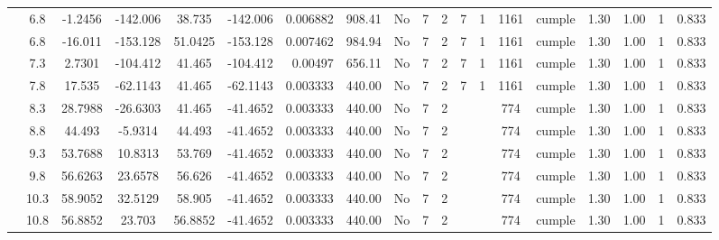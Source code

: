 \begin{table}[H]
{\begin{tabular}{|c|c|c|c|c|c|r|c|c|c|c|c|c|c|c|c|c|c|c|}
\cline{2-19}    & \cellcolor[rgb]{ .851,  .882,  .949}6.8 & -1.2456 & -142.006 & 38.735 & -142.006 & \multicolumn{1}{c|}{0.006882} & 908.41 & No  & 7   & 2   & 7   & 1   & 1161 & \cellcolor[rgb]{ .776,  .937,  .808}\textcolor[rgb]{ 0,  .38,  0}{cumple} & 1.30 & 1.00 & 1   & 0.833 \bigstrut\\
\cline{2-19}    & \cellcolor[rgb]{ .851,  .882,  .949}6.8 & -16.011 & -153.128 & 51.0425 & -153.128 & 0.007462 & 984.94 & No  & 7   & 2   & 7   & 1   & 1161 & \cellcolor[rgb]{ .776,  .937,  .808}cumple & 1.30 & 1.00 & 1   & 0.833 \bigstrut\\
\cline{2-19}    & 7.3 & 2.7301 & -104.412 & 41.465 & -104.412 & 0.00497 & 656.11 & No  & 7   & 2   & 7   & 1   & 1161 & \cellcolor[rgb]{ .776,  .937,  .808}cumple & 1.30 & 1.00 & 1   & 0.833 \bigstrut\\
\cline{2-19}    & 7.8 & 17.535 & -62.1143 & 41.465 & -62.1143 & 0.003333 & 440.00 & No  & 7   & 2   & 7   & 1   & 1161 & \cellcolor[rgb]{ .776,  .937,  .808}cumple & 1.30 & 1.00 & 1   & 0.833 \bigstrut\\
\cline{2-19}    & 8.3 & 28.7988 & -26.6303 & 41.465 & -41.4652 & 0.003333 & 440.00 & No  & 7   & 2   &     &     & 774 & \cellcolor[rgb]{ .776,  .937,  .808}cumple & 1.30 & 1.00 & 1   & 0.833 \bigstrut\\
\cline{2-19}    & 8.8 & 44.493 & -5.9314 & 44.493 & -41.4652 & \multicolumn{1}{c|}{0.003333} & 440.00 & No  & 7   & 2   &     &     & 774 & \cellcolor[rgb]{ .776,  .937,  .808}\textcolor[rgb]{ 0,  .38,  0}{cumple} & 1.30 & 1.00 & 1   & 0.833 \bigstrut\\
\cline{2-19}    & 9.3 & 53.7688 & 10.8313 & 53.769 & -41.4652 & 0.003333 & 440.00 & No  & 7   & 2   &     &     & 774 & \cellcolor[rgb]{ .776,  .937,  .808}cumple & 1.30 & 1.00 & 1   & 0.833 \bigstrut\\
\cline{2-19}    & 9.8 & 56.6263 & 23.6578 & 56.626 & -41.4652 & 0.003333 & 440.00 & No  & 7   & 2   &     &     & 774 & \cellcolor[rgb]{ .776,  .937,  .808}cumple & 1.30 & 1.00 & 1   & 0.833 \bigstrut\\
\cline{2-19}    & 10.3 & 58.9052 & 32.5129 & 58.905 & -41.4652 & 0.003333 & 440.00 & No  & 7   & 2   &     &     & 774 & \cellcolor[rgb]{ .776,  .937,  .808}cumple & 1.30 & 1.00 & 1   & 0.833 \bigstrut\\
\cline{2-19}    & 10.8 & 56.8852 & 23.703 & 56.8852 & -41.4652 & 0.003333 & 440.00 & No  & 7   & 2   &     &     & 774 & \cellcolor[rgb]{ .776,  .937,  .808}cumple & 1.30 & 1.00 & 1   & 0.833 \bigstrut\\

\end{tabular}}
\end{table}
